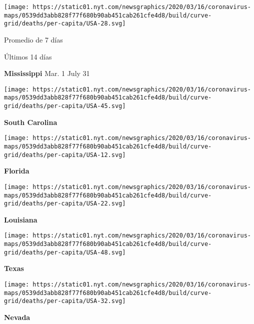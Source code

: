 \href{https://www.nytimes.com/interactive/2020/us/mississippi-coronavirus-cases.html}{}

\texttt{[image: https://static01.nyt.com/newsgraphics/2020/03/16/coronavirus-maps/0539dd3abb828f77f680b90ab451cab261cfe4d8/build/curve-grid/deaths/per-capita/USA-28.svg]}

Promedio de 7 días

Últimos 14 días

\textbf{Mississippi} Mar. 1 July 31

\href{https://www.nytimes.com/interactive/2020/us/south-carolina-coronavirus-cases.html}{}

\texttt{[image: https://static01.nyt.com/newsgraphics/2020/03/16/coronavirus-maps/0539dd3abb828f77f680b90ab451cab261cfe4d8/build/curve-grid/deaths/per-capita/USA-45.svg]}

\textbf{South Carolina}

\href{https://www.nytimes.com/interactive/2020/us/florida-coronavirus-cases.html}{}

\texttt{[image: https://static01.nyt.com/newsgraphics/2020/03/16/coronavirus-maps/0539dd3abb828f77f680b90ab451cab261cfe4d8/build/curve-grid/deaths/per-capita/USA-12.svg]}

\textbf{Florida}

\href{https://www.nytimes.com/interactive/2020/us/louisiana-coronavirus-cases.html}{}

\texttt{[image: https://static01.nyt.com/newsgraphics/2020/03/16/coronavirus-maps/0539dd3abb828f77f680b90ab451cab261cfe4d8/build/curve-grid/deaths/per-capita/USA-22.svg]}

\textbf{Louisiana}

\href{https://www.nytimes.com/interactive/2020/us/texas-coronavirus-cases.html}{}

\texttt{[image: https://static01.nyt.com/newsgraphics/2020/03/16/coronavirus-maps/0539dd3abb828f77f680b90ab451cab261cfe4d8/build/curve-grid/deaths/per-capita/USA-48.svg]}

\textbf{Texas}

\href{https://www.nytimes.com/interactive/2020/us/nevada-coronavirus-cases.html}{}

\texttt{[image: https://static01.nyt.com/newsgraphics/2020/03/16/coronavirus-maps/0539dd3abb828f77f680b90ab451cab261cfe4d8/build/curve-grid/deaths/per-capita/USA-32.svg]}

\textbf{Nevada}

\href{https://www.nytimes.com/interactive/2020/us/georgia-coronavirus-cases.html}{}

